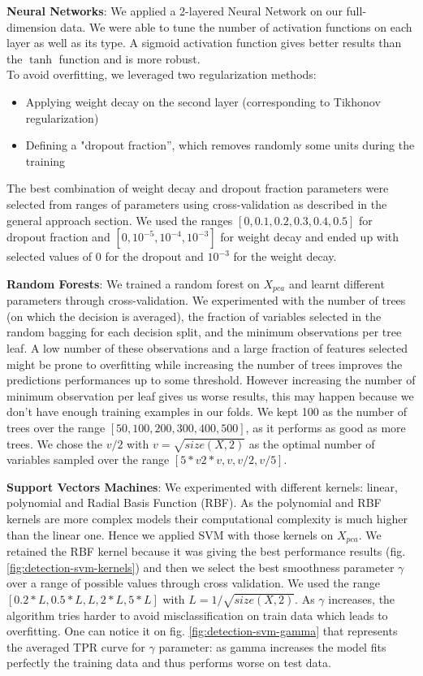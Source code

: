 \documentclass[10pt,a4paper]{article}
\begin{document}
    \textbf{Neural Networks}: We applied a 2-layered Neural Network on our full-dimension data. We were able to tune the number of activation functions on each layer as well as its type. A sigmoid activation function gives better results than the $\tanh$ function and is more robust.\\
  To avoid overfitting, we leveraged two regularization methods:
  \begin{itemize}
   	\item Applying weight decay on the second layer (corresponding to Tikhonov regularization)
	  \item Defining a "dropout fraction'', which removes randomly some units during the training \cite{dropout}
  \end{itemize}
	The best combination of weight decay and dropout fraction parameters were selected from ranges of parameters using cross-validation as described in the general approach section. We used  the ranges $[0, 0.1, 0.2, 0.3, 0.4, 0.5]$ for dropout fraction and $[0, 10^{-5}, 10^{-4}, 10^{-3}]$ for weight decay and ended up with selected values of $0$ for the dropout and $10^{-3}$ for the weight decay.

    \textbf{Random Forests}: We trained a random forest on $X_{pca}$ and learnt different parameters through cross-validation. We experimented with the number of trees (on which the decision is averaged), the fraction of variables selected in the random bagging for each decision split, and the minimum observations per tree leaf. A low number of these observations and a large fraction of features selected might be prone to overfitting while increasing the number of trees improves the predictions performances up to some threshold. However increasing the number of minimum observation per leaf gives us worse results, this may happen because we don't have enough training examples in our folds. We kept 100 as the number of trees over the range $[50, 100, 200, 300, 400, 500]$, as it performs as good as more trees. We chose the $v/ 2$ with $v = \sqrt{size(X,2)}$ as the optimal number of variables sampled over the range $[5*v 2*v, v, v/ 2, v/ 5]$.

  \textbf{Support Vectors Machines}: We experimented with different kernels: linear, polynomial and Radial Basis Function (RBF). As the polynomial and RBF kernels are more complex models their computational complexity is much higher than the linear one. Hence we applied SVM with those kernels on $X_{pca}$. We retained the RBF kernel because it was giving the best performance results (fig. \ref{fig:detection-svm-kernels}) and then we select the best smoothness parameter $\gamma$ over a range of possible values through cross validation. We used the range $[0.2*L, 0.5*L, L, 2*L, 5*L]$ with $L = 1 / \sqrt{size(X,2)}$. As $\gamma$ increases, the algorithm tries harder to avoid misclassification on train data which leads to overfitting. One can notice it on fig. \ref{fig:detection-svm-gamma} that represents the averaged TPR curve for $\gamma$ parameter: as gamma increases the model fits perfectly the training data and thus performs worse on test data.
\end{document}
